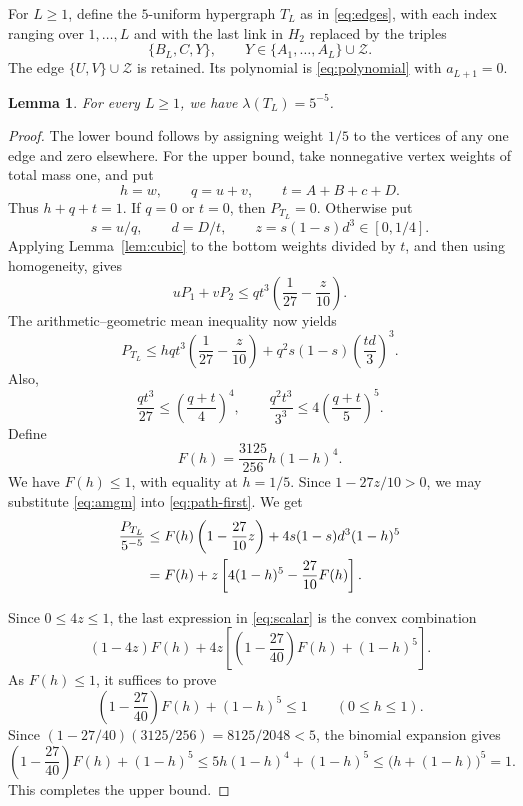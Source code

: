 \documentclass[11pt]{article}
\newtheorem{lemma}[theorem]{Lemma}
\numberwithin{equation}{section}
\newcommand{\Z}{\mathcal Z}
\begin{document}
For \(L\ge1\), define the \(5\)-uniform hypergraph \(T_L\)
as in \eqref{eq:edges}, with each index ranging over \(1,\ldots,L\)
and with the last link in \(H_2\) replaced by the triples
\[
 \{B_L,C,Y\},\qquad Y\in\{A_1,\ldots,A_L\}\cup\Z.
\]
The edge \(\{U,V\}\cup\Z\) is retained.
Its polynomial is \eqref{eq:polynomial} with \(a_{L+1}=0\).

\begin{lemma}\label{lem:path}
For every \(L\ge1\), we have \(\lambda(T_L)=5^{-5}\).
\end{lemma}

\begin{proof}
The lower bound follows by assigning weight \(1/5\) to the vertices
of any one edge and zero elsewhere. For the upper bound, take
nonnegative vertex weights of total mass one, and put
\[
 h=w,\qquad q=u+v,\qquad t=A+B+c+D.
\]
Thus \(h+q+t=1\). If \(q=0\) or \(t=0\), then \(P_{T_L}=0\).
Otherwise put
\[
 s=u/q,\qquad d=D/t,\qquad z=s(1-s)d^3\in[0,1/4].
\]
Applying Lemma~\ref{lem:cubic} to the bottom weights divided by
\(t\), and then using homogeneity, gives
\[
 uP_1+vP_2\le qt^3\left(\frac1{27}-\frac z{10}\right).
\]
The arithmetic--geometric mean inequality now yields
\begin{equation}\label{eq:path-first}
 P_{T_L}\le
 hqt^3
       \left(\frac1{27}-\frac z{10}\right)
 +q^2s(1-s)\left(\frac{td}{3}\right)^3.
\end{equation}
Also,
\begin{equation}\label{eq:amgm}
 \frac{qt^3}{27}\le\left(\frac{q+t}{4}\right)^4,
 \qquad
 \frac{q^2t^{3}}{3^{3}}\le4\left(\frac{q+t}{5}\right)^5.
\end{equation}
Define
\[
 F(h)=\frac{3125}{256}h(1-h)^4.
\]
We have \(F(h)\le1\), with equality at \(h=1/5\).
Since \(1-27z/10>0\), we may substitute \eqref{eq:amgm}
into \eqref{eq:path-first}. We get
\begin{align}
 \frac{P_{T_L}}{5^{-5}}
 &\le F(h)\left(1-\frac{27}{10}z\right)
        +4s(1-s)d^{3}(1-h)^5\notag\\
 &=F(h)+z\left[4(1-h)^5-\frac{27}{10}F(h)\right].
 \label{eq:scalar}
\end{align}

Since \(0\le4z\le1\), the last expression in \eqref{eq:scalar} is
the convex combination
\[
 (1-4z)F(h)+4z\left[\left(1-\frac{27}{40}\right)F(h)+(1-h)^5\right].
\]
As \(F(h)\le1\), it suffices to prove
\begin{equation}\label{eq:scalar-endpoint}
 \left(1-\frac{27}{40}\right)F(h)+(1-h)^5\le1
 \qquad(0\le h\le1).
\end{equation}
Since \((1-27/40)(3125/256)=8125/2048<5\), the binomial
expansion gives
\[
 \left(1-\frac{27}{40}\right)F(h)+(1-h)^5
 \le5h(1-h)^4+(1-h)^5
 \le\bigl(h+(1-h)\bigr)^5=1.
\]
This completes the upper bound.
\end{proof}
\end{document}
